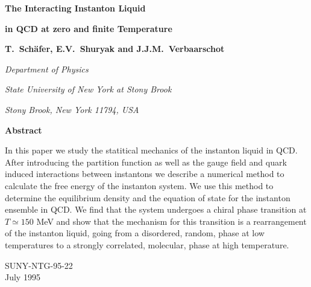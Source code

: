 
\def\baselinestrech{1.5}
\setlength{\textwidth}{16cm}
\setlength{\textheight}{23cm}
\large
\hoffset -1.0cm
\voffset -2.2cm
\setlength{\baselineskip}{23pt}
\flushbottom


\newcommand{\be}{\begin{eqnarray}}
\newcommand{\ee}{\end{eqnarray}}
\newcommand\ident{{\bf 1}}
\newcommand\unity{{1\!\! 1}}
\newcommand{\nsz}{\textstyle}


\setlength{\baselineskip}{23pt}
\setlength{\baselineskip}{27pt}
\pagestyle{empty}
\renewcommand{\thefootnote}{\fnsymbol{footnote}}
\centerline{\bf\LARGE The Interacting Instanton Liquid }
\centerline{\bf\LARGE in QCD at zero and finite Temperature}
\vskip 1cm
\centerline{\bf T.~Sch\"afer, E.V.~Shuryak and J.J.M.~Verbaarschot}
\vskip 1cm
\centerline{\it Department of Physics}
\centerline{\it State University of New York at Stony Brook}
\centerline{\it Stony Brook, New York 11794, USA}
\vskip 1cm

\setlength{\baselineskip}{16pt}
\centerline{\bf Abstract}
   In this paper we study the statitical mechanics of the instanton
liquid in QCD. After introducing the partition function as well as
the gauge field and quark induced interactions between instantons
we describe a numerical method to calculate the free energy of the
instanton system. We use this method to determine the equilibrium
density and the equation of state for the instanton ensemble in
QCD. We find that the system undergoes a chiral phase transition
at $T\simeq 150$ MeV and show that the mechanism for this transition
is a rearrangement of the instanton liquid, going from a disordered,
random, phase at low temperatures to a strongly correlated, molecular,
phase at high temperature.
\vfill
\begin{flushleft}
SUNY-NTG-95-22\\
July 1995
\end{flushleft}
\eject
\newpage
\setlength{\baselineskip}{23pt}
\pagestyle{plain}
\renewcommand{\thefootnote}{\arabic{footnote}}
\setcounter{footnote}{0}
\setcounter{page}{1}

